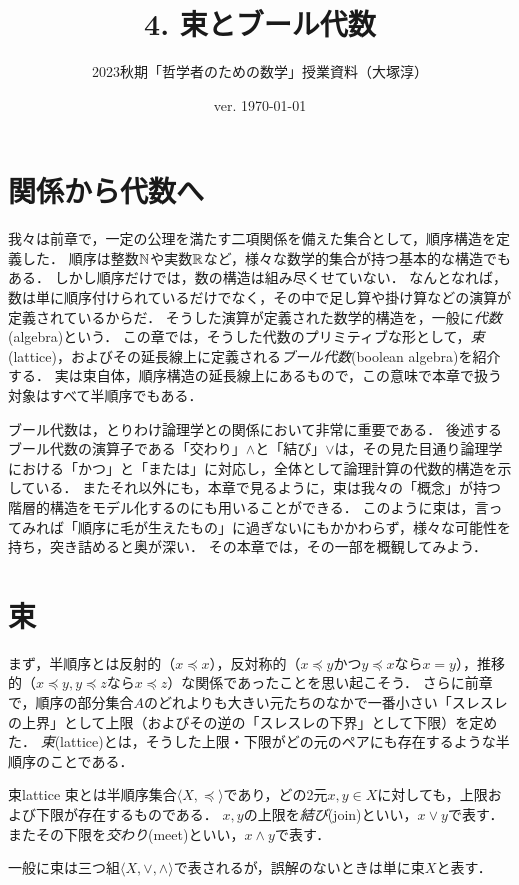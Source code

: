 \documentclass[11pt,a4paper, dvipdfmx]{jsarticle}
\begin{document}
\title{4. 束とブール代数}
\author{2023秋期「哲学者のための数学」授業資料（大塚淳）}
\date{ver. \today}
\maketitle

\section{関係から代数へ}
我々は前章で，一定の公理を満たす二項関係を備えた集合として，順序構造を定義した．
順序は整数$\mathbb{N}$や実数$\mathbb{R}$など，様々な数学的集合が持つ基本的な構造でもある．
しかし順序だけでは，数の構造は組み尽くせていない．
なんとなれば，数は単に順序付けられているだけでなく，その中で足し算や掛け算などの演算が定義されているからだ．
そうした演算が定義された数学的構造を，一般に\emph{代数}(algebra)という．
この章では，そうした代数のプリミティブな形として，\emph{束}(lattice)，およびその延長線上に定義される\emph{ブール代数}(boolean algebra)を紹介する．
実は束自体，順序構造の延長線上にあるもので，この意味で本章で扱う対象はすべて半順序でもある．

ブール代数は，とりわけ論理学との関係において非常に重要である．
後述するブール代数の演算子である「交わり」$\wedge$と「結び」$\vee$は，その見た目通り論理学における「かつ」と「または」に対応し，全体として論理計算の代数的構造を示している．
またそれ以外にも，本章で見るように，束は我々の「概念」が持つ階層的構造をモデル化するのにも用いることができる．
このように束は，言ってみれば「順序に毛が生えたもの」に過ぎないにもかかわらず，様々な可能性を持ち，突き詰めると奥が深い．
その本章では，その一部を概観してみよう．

\section{束}

まず，半順序とは反射的（$x \preceq x$），反対称的（$x \preceq y$かつ$y \preceq x$なら$x=y$），推移的（$x \preceq y, y \preceq z$なら$x \preceq z$）な関係であったことを思い起こそう．
さらに前章で，順序の部分集合$A$のどれよりも大きい元たちのなかで一番小さい「スレスレの上界」として上限（およびその逆の「スレスレの下界」として下限）を定めた．
\emph{束}(lattice)とは，そうした上限・下限がどの元のペアにも存在するような半順序のことである．

\begin{dfn}{束}{lattice}
束とは半順序集合$\langle X, \preceq \rangle$であり，どの2元$x, y \in X$に対しても，上限および下限が存在するものである．
$x, y$の上限を\emph{結び}(join)といい，$x \vee y$で表す．またその下限を\emph{交わり}(meet)といい，$x \wedge y$で表す．

一般に束は三つ組$\langle X, \vee, \wedge \rangle$で表されるが，誤解のないときは単に束$X$と表す．
\end{dfn}
\end{document}
